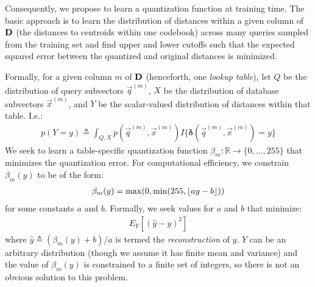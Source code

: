 Consequently, we propose to learn a quantization function at training time. The basic approach is to learn the distribution of distances within a given column of $\mat{D}$ (the distances to centroids within one codebook) across many queries sampled from the training set and find upper and lower cutoffs such that the expected squared error between the quantized and original distances is minimized.

Formally, for a given column $m$ of $\mat{D}$ (henceforth, one \textit{lookup table}), let $Q$ be the distribution of query subvectors $\vec{q}^{(m)}$, $X$ be the distribution of database subvectors $\vec{x}^{(m)}$, and $Y$ be the scalar-valued distribution of distances within that table. I.e.:
\begin{align}
    p(Y = y) \triangleq \int_{Q, X} p(\vec{q}^{(m)}, \vec{x}^{(m)})I\{\boldsymbol{\delta} \left( \vec{q}^{(m)}, \vec{x}^{(m)} \right) = y\}
\end{align}
We seek to learn a table-specific quantization function $\beta_m: \mathbb{R} \rightarrow \{0,\ldots,255\} $ that minimizes the quantization error. For computational efficiency, we constrain $\beta_m(y)$ to be of the form:
\begin{align}
    \beta_m(y) = \max(0, \min(255, \floor*{ay - b}))
\end{align}
for some constants $a$ and $b$. Formally, we seek values for $a$ and $b$ that minimize:
\begin{align}
    E_Y[(\hat{y} - y)^2]
\end{align}
where $\hat{y} \triangleq (\beta_m(y) + b)/a$ is termed the \textit{reconstruction} of $y$.
$Y$ can be an arbitrary distribution (though we assume it has finite mean and variance) and the value of $\beta_m(y)$ is constrained to a finite set of integers, so there is not an obvious solution to this problem.

